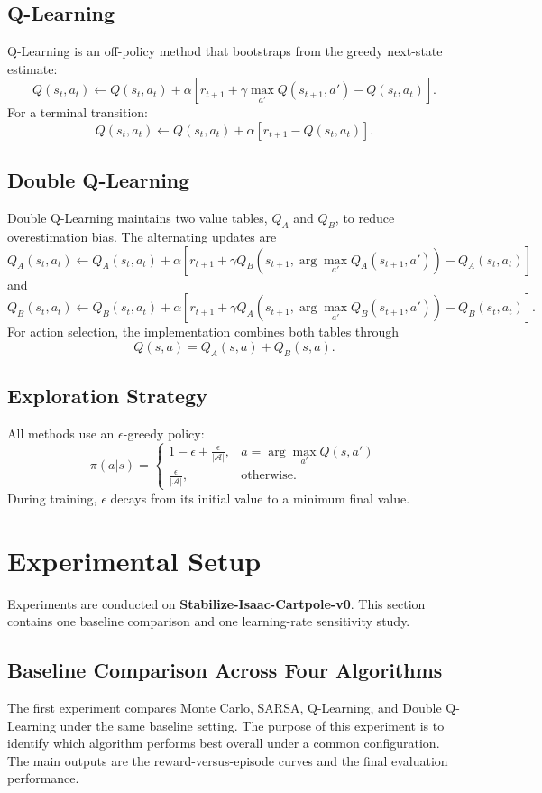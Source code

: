 \documentclass[11pt]{article} %
\begin{document}
\subsection{Q-Learning}
Q-Learning is an off-policy method that bootstraps from the greedy next-state estimate:
\[
Q(s_t,a_t) \leftarrow Q(s_t,a_t) + \alpha \left[r_{t+1} + \gamma \max_{a'}Q(s_{t+1},a') - Q(s_t,a_t)\right].
\]
For a terminal transition:
\[
Q(s_t,a_t) \leftarrow Q(s_t,a_t) + \alpha \left[r_{t+1} - Q(s_t,a_t)\right].
\]

\subsection{Double Q-Learning}
Double Q-Learning maintains two value tables, $Q_A$ and $Q_B$, to reduce overestimation bias. The alternating updates are
\[
Q_A(s_t,a_t) \leftarrow Q_A(s_t,a_t) + \alpha \left[r_{t+1} + \gamma Q_B\left(s_{t+1}, \arg\max_{a'} Q_A(s_{t+1},a')\right) - Q_A(s_t,a_t)\right]
\]
and
\[
Q_B(s_t,a_t) \leftarrow Q_B(s_t,a_t) + \alpha \left[r_{t+1} + \gamma Q_A\left(s_{t+1}, \arg\max_{a'} Q_B(s_{t+1},a')\right) - Q_B(s_t,a_t)\right].
\]
For action selection, the implementation combines both tables through
\[
Q(s,a) = Q_A(s,a) + Q_B(s,a).
\]

\subsection{Exploration Strategy}
All methods use an $\epsilon$-greedy policy:
\[
\pi(a|s)=
\begin{cases}
1-\epsilon + \frac{\epsilon}{|\mathcal{A}|}, & a = \arg\max_{a'}Q(s,a') \\
\frac{\epsilon}{|\mathcal{A}|}, & \text{otherwise.}
\end{cases}
\]
During training, $\epsilon$ decays from its initial value to a minimum final value.

\section{Experimental Setup}
Experiments are conducted on \textbf{Stabilize-Isaac-Cartpole-v0}. This section contains one baseline comparison and one learning-rate sensitivity study.

\subsection{Baseline Comparison Across Four Algorithms}
The first experiment compares Monte Carlo, SARSA, Q-Learning, and Double Q-Learning under the same baseline setting. The purpose of this experiment is to identify which algorithm performs best overall under a common configuration. The main outputs are the reward-versus-episode curves and the final evaluation performance.
\end{document}
